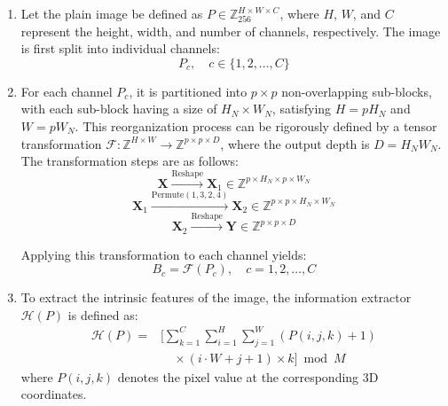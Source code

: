 \documentclass[a4paper,fleqn]{cas-dc}
\theoremstyle{plain}
\theoremstyle{definition}
\begin{document}
\begin{enumerate}
	\item 
	Let the plain image be defined as $P \in \mathbb{Z}^{H \times W \times C}_{256}$, where $H$, $W$, and $C$ represent the height, width, and number of channels, respectively. The image is first split into individual channels:
	\begin{equation}
		P_c, \quad c \in \{1, 2, \dots, C\}
	\end{equation}

\item
For each channel $P_c$, it is partitioned into $p \times p$ non-overlapping sub-blocks, with each sub-block having a size of $H_N \times W_N$, satisfying $H = p H_N$ and $W = p W_N$. This reorganization process can be rigorously defined by a tensor transformation $\mathcal{F}: \mathbb{Z}^{H \times W} \to \mathbb{Z}^{p \times p \times D}$, where the output depth is $D = H_N W_N$. The transformation steps are as follows:
\begin{equation}
	\mathbf{X} \xrightarrow{\text{Reshape}} \mathbf{X}_1 \in \mathbb{Z}^{p \times H_N \times p \times W_N}
\end{equation}
\begin{equation}
	\mathbf{X}_1 \xrightarrow{\text{Permute}(1, 3, 2, 4)} \mathbf{X}_2 \in \mathbb{Z}^{p \times p \times H_N \times W_N}
\end{equation}
\begin{equation}
	\mathbf{X}_2 \xrightarrow{\text{Reshape}} \mathbf{Y} \in \mathbb{Z}^{p \times p \times D}
\end{equation}

Applying this transformation to each channel yields:
\begin{equation}
	B_c = \mathcal{F}(P_c), \quad c = 1, 2, \dots, C
\end{equation}

\item
To extract the intrinsic features of the image, the information extractor $\mathcal{H}(P)$ is defined as:
\begin{equation}
	\begin{aligned}
	\mathcal{H}(P) = {} &\Bigg[\sum_{k=1}^{C} \sum_{i=1}^{H} \sum_{j=1}^{W} (P(i,j,k) + 1) \\
	&\quad \times (i \cdot W + j + 1) \times k\Bigg] \bmod M
	\end{aligned}
\end{equation}
where $P(i,j,k)$ denotes the pixel value at the corresponding 3D coordinates.


\end{enumerate}
\end{document}
